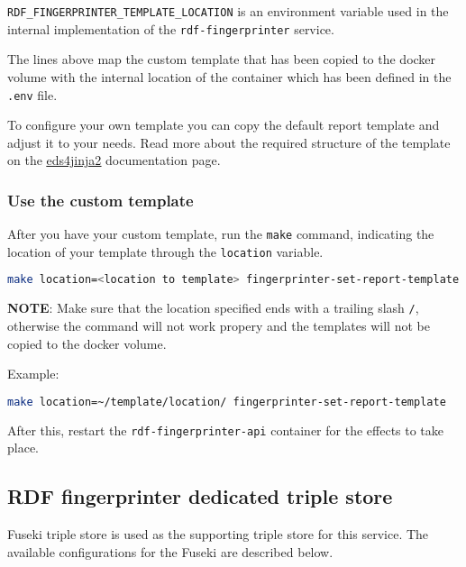 		\texttt{RDF\_FINGERPRINTER\_TEMPLATE\_LOCATION} is an environment variable used in the internal implementation of the \texttt{rdf-fingerprinter} service.

		The lines above map the custom template that has been copied to the docker volume with the internal location of the container which has been defined in the \texttt{.env} file.

		To configure your own template you can copy the default report template and adjust it to your needs. Read more about the required structure of the template on the \href{https://eds4jinja2.readthedocs.io/en/latest/#target-directory-layout}{\underline{eds4jinja2}} documentation page.

		\subsubsection{Use the custom template}
		After you have your custom template, run the \texttt{make} command, indicating the location of your template through the \texttt{location} variable.
		\begin{lstlisting}[language=bash]
make location=<location to template> fingerprinter-set-report-template
		\end{lstlisting}

		\textbf{NOTE}: Make sure that the location specified ends with a trailing slash \texttt{/}, otherwise the command will not work propery and the templates will not be copied to the docker volume.

		Example:
		\begin{lstlisting}[language=bash]
make location=~/template/location/ fingerprinter-set-report-template
		\end{lstlisting}

		After this, restart the \texttt{rdf-fingerprinter-api} container for the effects to take place.


	\subsection{RDF fingerprinter dedicated triple store}
	
	Fuseki triple store is used as the supporting triple store for this service.
	The available configurations for the Fuseki are described below. 
	
